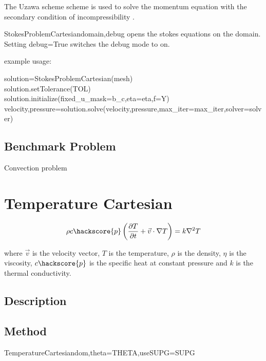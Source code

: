 The Uzawa scheme scheme is used to solve the momentum equation with the secondary condition of incompressibility \cite{GROSS2006,AAMIRBERKYAN2008}.

\begin{classdesc}{StokesProblemCartesian}{domain,debug}
opens the stokes equations on the \Domain domain. Setting debug=True switches the debug mode to on.
\end{classdesc}

example usage:

solution=StokesProblemCartesian(mesh) \\
solution.setTolerance(TOL) \\
solution.initialize(fixed\_u\_mask=b\_c,eta=eta,f=Y) \\
velocity,pressure=solution.solve(velocity,pressure,max\_iter=max\_iter,solver=solver) \\

\subsection{Benchmark Problem}

Convection problem


\section{Temperature Cartesian}

\begin{equation}
\rho c\hackscore{p} \left (\frac{\partial T}{\partial t} + \vec{v} \cdot \nabla T \right ) = k \nabla^{2}T
\label{HEAT EQUATION}
\end{equation}

where $\vec{v}$ is the velocity vector, $T$ is the temperature, $\rho$ is the density, $\eta$ is the viscosity, $c\hackscore{p}$ is the specific heat at constant pressure and $k$ is the thermal conductivity.

\subsection{Description}

\subsection{Method}

\begin{classdesc}{TemperatureCartesian}{dom,theta=THETA,useSUPG=SUPG}
\end{classdesc}

